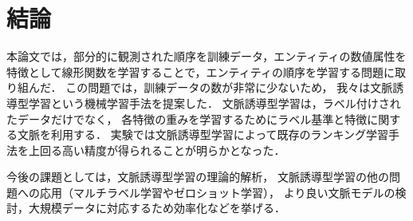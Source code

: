 \chapter{結論}
\label{sq:Conclusions}

本論文では，部分的に観測された順序を訓練データ，エンティティの数値属性を特徴として線形関数を学習することで，エンティティの順序を学習する問題に取り組んだ．
この問題では，訓練データの数が非常に少ないため，
我々は文脈誘導型学習という機械学習手法を提案した．
文脈誘導型学習は，ラベル付けされたデータだけでなく，
各特徴の重みを学習するためにラベル基準と特徴に関する文脈を利用する．
実験では文脈誘導型学習によって既存のランキング学習手法を上回る高い精度が得られることが明らかとなった．

今後の課題としては，文脈誘導型学習の理論的解析，
文脈誘導型学習の他の問題への応用（マルチラベル学習やゼロショット学習），
より良い文脈モデルの検討，大規模データに対応するため効率化などを挙げる．